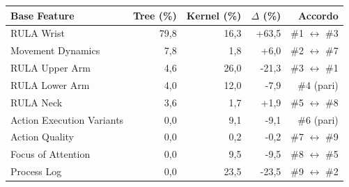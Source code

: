 \begin{tabular*}{\linewidth}{@{}l@{\extracolsep{\fill}}rrrr@{}}
\toprule
\textbf{Base Feature} & \textbf{Tree (\%)} & \textbf{Kernel (\%)} & \textbf{$\Delta$ (\%)} & \textbf{Accordo} \\
\midrule
RULA Wrist & 79{,}8 & 16{,}3 & +63{,}5 & \#1 $\leftrightarrow$ \#3 \\
Movement Dynamics & 7{,}8 & 1{,}8 & +6{,}0 & \#2 $\leftrightarrow$ \#7 \\
RULA Upper Arm & 4{,}6 & 26{,}0 & -21{,}3 & \#3 $\leftrightarrow$ \#1 \\
RULA Lower Arm & 4{,}0 & 12{,}0 & -7{,}9 & \#4 (pari) \\
RULA Neck & 3{,}6 & 1{,}7 & +1{,}9 & \#5 $\leftrightarrow$ \#8 \\
Action Execution Variants & 0{,}0 & 9{,}1 & -9{,}1 & \#6 (pari) \\
Action Quality & 0{,}0 & 0{,}2 & -0{,}2 & \#7 $\leftrightarrow$ \#9 \\
Focus of Attention & 0{,}0 & 9{,}5 & -9{,}5 & \#8 $\leftrightarrow$ \#5 \\
Process Log & 0{,}0 & 23{,}5 & -23{,}5 & \#9 $\leftrightarrow$ \#2 \\
\bottomrule
\end{tabular*}
